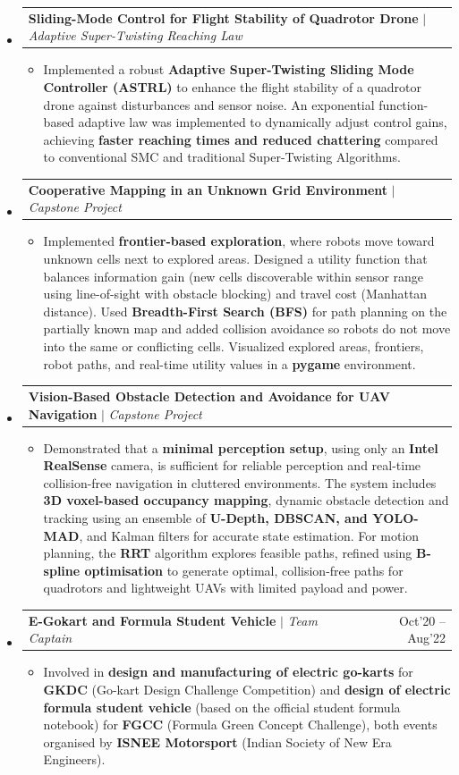 \documentclass[a4paper,10pt]{article}
\makeatletter
\newcommand{\resumeProjectHeading}[2]{
	\vspace{5pt}\item
	\begin{tabular*}{0.99\textwidth}{l@{\extracolsep{\fill}}r}
		\small#1 & \small#2 \\
	\end{tabular*}\vspace{3pt}
}
\newcommand{\resumeItemDesc}[1]{
	\begin{itemize}[leftmargin=0.32in, label={}, topsep=0pt, partopsep=0pt]
		\item \small{#1}
	\end{itemize}
	\vspace{1pt}
}
\makeatother
\begin{document}
\begin{itemize}[leftmargin=0.15in, label={}]
		\resumeProjectHeading
		{\textbf{Sliding-Mode Control for Flight Stability of Quadrotor Drone} $|$ \emph{Adaptive Super-Twisting Reaching Law}}{}
		\vspace{-6pt}
		\resumeItemDesc{Implemented a robust \textbf{Adaptive Super-Twisting Sliding Mode Controller (ASTRL)} to enhance the flight stability of a quadrotor drone against disturbances and sensor noise. An exponential function-based adaptive law was implemented to dynamically adjust control gains, achieving \textbf{faster reaching times and reduced chattering} compared to conventional SMC and traditional Super-Twisting Algorithms.}
		
		\resumeProjectHeading
		{\textbf{Cooperative Mapping in an Unknown Grid Environment} $|$ \emph{Capstone Project}}{}
		\vspace{-6pt}
		\resumeItemDesc{Implemented \textbf{frontier-based exploration}, where robots move toward unknown cells next to explored areas. Designed a utility function that balances information gain (new cells discoverable within sensor range using line-of-sight with obstacle blocking) and travel cost (Manhattan distance). Used \textbf{Breadth-First Search (BFS)} for path planning on the partially known map and added collision avoidance so robots do not move into the same or conflicting cells. Visualized explored areas, frontiers, robot paths, and real-time utility values in a \textbf{pygame} environment.}
		
		\resumeProjectHeading
		{\textbf{Vision-Based Obstacle Detection and Avoidance for UAV Navigation} $|$ \emph{Capstone Project}}{}
		\vspace{-6pt}
		\resumeItemDesc{Demonstrated that a \textbf{minimal perception setup}, using only an \textbf{Intel RealSense} camera, is sufficient for reliable perception and real-time collision-free navigation in cluttered environments. The system includes \textbf{3D voxel-based occupancy mapping}, dynamic obstacle detection and tracking using an ensemble of \textbf{U-Depth, DBSCAN, and YOLO-MAD}, and Kalman filters for accurate state estimation. For motion planning, the \textbf{RRT} algorithm explores feasible paths, refined using \textbf{B-spline optimisation} to generate optimal, collision-free paths for quadrotors and lightweight UAVs with limited payload and power.}
		
		\resumeProjectHeading
		{\textbf{E-Gokart and Formula Student Vehicle} $|$ \emph{Team Captain}}{Oct'20 -- Aug'22}
		\vspace{-6pt}
		\resumeItemDesc{Involved in \textbf{design and manufacturing of electric go-karts} for \textbf{GKDC} (Go-kart Design Challenge Competition) and \textbf{design of electric formula student vehicle} (based on the official student formula notebook) for \textbf{FGCC} (Formula Green Concept Challenge), both events organised by \textbf{ISNEE Motorsport} (Indian Society of New Era Engineers).}
		

\end{itemize}
\end{document}
